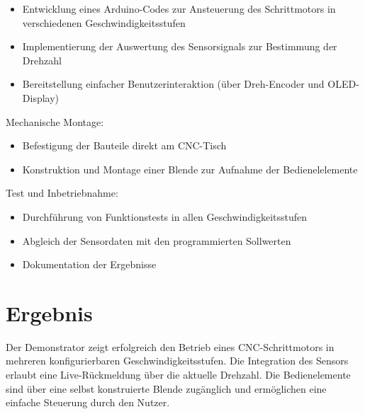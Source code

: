 \begin{itemize}
	\item Entwicklung eines Arduino-Codes zur Ansteuerung des Schrittmotors in verschiedenen Geschwindigkeitsstufen
	\item Implementierung der Auswertung des Sensorsignals zur Bestimmung der Drehzahl
	\item Bereitstellung einfacher Benutzerinteraktion (über Dreh-Encoder und OLED-Display)
\end{itemize}

Mechanische Montage:

\begin{itemize}
	\item Befestigung der Bauteile direkt am CNC-Tisch
	\item Konstruktion und Montage einer Blende zur Aufnahme der Bedienelelemente
\end{itemize}

Test und Inbetriebnahme:

\begin{itemize}
	\item Durchführung von Funktionstests in allen Geschwindigkeitsstufen
	\item Abgleich der Sensordaten mit den programmierten Sollwerten
	\item Dokumentation der Ergebnisse
\end{itemize}

\section{Ergebnis}

Der Demonstrator zeigt erfolgreich den Betrieb eines CNC-Schrittmotors in mehreren konfigurierbaren Geschwindigkeitsstufen. Die Integration des Sensors erlaubt eine Live-Rückmeldung über die aktuelle Drehzahl. Die Bedienelemente sind über eine selbst konstruierte Blende zugänglich und ermöglichen eine einfache Steuerung durch den Nutzer.